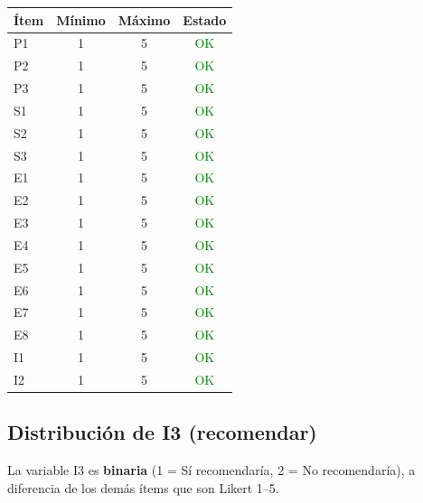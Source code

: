 \documentclass[
  spanish,
]{article}
\begin{document}
\begin{longtable}[t]{lcc>{}c}
\toprule
Ítem & Mínimo & Máximo & Estado\\
\midrule
P1 & 1 & 5 & \textcolor{green}{OK}\\
P2 & 1 & 5 & \textcolor{green}{OK}\\
P3 & 1 & 5 & \textcolor{green}{OK}\\
S1 & 1 & 5 & \textcolor{green}{OK}\\
S2 & 1 & 5 & \textcolor{green}{OK}\\
\addlinespace
S3 & 1 & 5 & \textcolor{green}{OK}\\
E1 & 1 & 5 & \textcolor{green}{OK}\\
E2 & 1 & 5 & \textcolor{green}{OK}\\
E3 & 1 & 5 & \textcolor{green}{OK}\\
E4 & 1 & 5 & \textcolor{green}{OK}\\
\addlinespace
E5 & 1 & 5 & \textcolor{green}{OK}\\
E6 & 1 & 5 & \textcolor{green}{OK}\\
E7 & 1 & 5 & \textcolor{green}{OK}\\
E8 & 1 & 5 & \textcolor{green}{OK}\\
I1 & 1 & 5 & \textcolor{green}{OK}\\
\addlinespace
I2 & 1 & 5 & \textcolor{green}{OK}\\
\bottomrule
\end{longtable}

\subsection{Distribución de I3
(recomendar)}\label{distribuciuxf3n-de-i3-recomendar}

La variable I3 es \textbf{binaria} (1 = Sí recomendaría, 2 = No
recomendaría), a diferencia de los demás ítems que son Likert 1--5.
\end{document}
